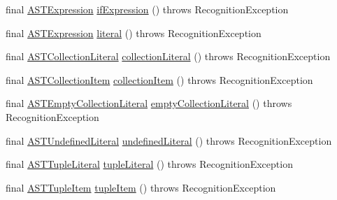 \begin{DoxyCompactItemize}
\item 
final \hyperlink{classorg_1_1tzi_1_1use_1_1parser_1_1ocl_1_1_a_s_t_expression}{A\-S\-T\-Expression} \hyperlink{classorg_1_1tzi_1_1use_1_1parser_1_1shell_1_1_shell_command_parser_aa042b4bf0695b00e1db2c44dd1221b42}{if\-Expression} ()  throws Recognition\-Exception 
\item 
final \hyperlink{classorg_1_1tzi_1_1use_1_1parser_1_1ocl_1_1_a_s_t_expression}{A\-S\-T\-Expression} \hyperlink{classorg_1_1tzi_1_1use_1_1parser_1_1shell_1_1_shell_command_parser_a561016ffb077393feb44f422cd41f96a}{literal} ()  throws Recognition\-Exception 
\item 
final \hyperlink{classorg_1_1tzi_1_1use_1_1parser_1_1ocl_1_1_a_s_t_collection_literal}{A\-S\-T\-Collection\-Literal} \hyperlink{classorg_1_1tzi_1_1use_1_1parser_1_1shell_1_1_shell_command_parser_aea883e83775c97725879a6864c0a4eb2}{collection\-Literal} ()  throws Recognition\-Exception 
\item 
final \hyperlink{classorg_1_1tzi_1_1use_1_1parser_1_1ocl_1_1_a_s_t_collection_item}{A\-S\-T\-Collection\-Item} \hyperlink{classorg_1_1tzi_1_1use_1_1parser_1_1shell_1_1_shell_command_parser_ad79f350f43b6a4108ee4d1c0c0d71715}{collection\-Item} ()  throws Recognition\-Exception 
\item 
final \hyperlink{classorg_1_1tzi_1_1use_1_1parser_1_1ocl_1_1_a_s_t_empty_collection_literal}{A\-S\-T\-Empty\-Collection\-Literal} \hyperlink{classorg_1_1tzi_1_1use_1_1parser_1_1shell_1_1_shell_command_parser_a053c1f7d45b073c9bc66e7d751793776}{empty\-Collection\-Literal} ()  throws Recognition\-Exception 
\item 
final \hyperlink{classorg_1_1tzi_1_1use_1_1parser_1_1ocl_1_1_a_s_t_undefined_literal}{A\-S\-T\-Undefined\-Literal} \hyperlink{classorg_1_1tzi_1_1use_1_1parser_1_1shell_1_1_shell_command_parser_ad6fb8578d56ad607f8f2b1ecdf5ba79d}{undefined\-Literal} ()  throws Recognition\-Exception 
\item 
final \hyperlink{classorg_1_1tzi_1_1use_1_1parser_1_1ocl_1_1_a_s_t_tuple_literal}{A\-S\-T\-Tuple\-Literal} \hyperlink{classorg_1_1tzi_1_1use_1_1parser_1_1shell_1_1_shell_command_parser_a70d5e4596f9cf4eb55db5a08870af6f8}{tuple\-Literal} ()  throws Recognition\-Exception 
\item 
final \hyperlink{classorg_1_1tzi_1_1use_1_1parser_1_1ocl_1_1_a_s_t_tuple_item}{A\-S\-T\-Tuple\-Item} \hyperlink{classorg_1_1tzi_1_1use_1_1parser_1_1shell_1_1_shell_command_parser_aeddc5bb1003092884f48183beee790c6}{tuple\-Item} ()  throws Recognition\-Exception 
\item 

\end{DoxyCompactItemize}
